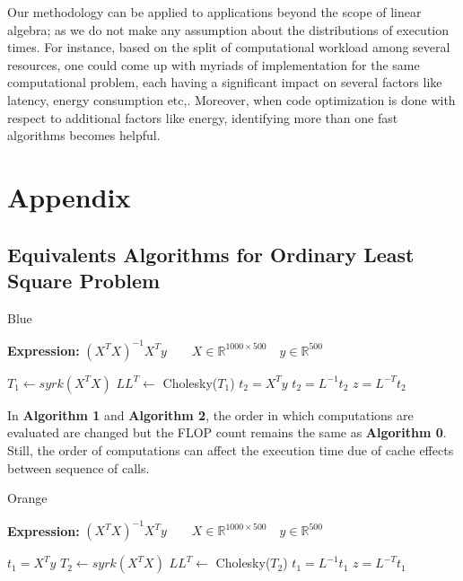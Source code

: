 \documentclass[conference]{IEEEtran}
\begin{document}
Our methodology can be applied to applications beyond the scope of linear algebra; as we do not make any assumption about the distributions of execution times.  For instance, based on the split of computational workload among several resources, one could come up with myriads of implementation for the same computational problem, each having a significant impact on several factors like latency, energy consumption etc,\cite{clonecloud}. Moreover, when code optimization is done with respect to additional factors like energy, identifying more than one fast algorithms becomes helpful. 




\clearpage
\section*{Appendix}
\subsection{Equivalents Algorithms for Ordinary Least Square Problem}
\label{sec:appA}
\begin{algorithm}
	\renewcommand{\thealgorithm}{}
	\caption{ Blue }
	\label{alg:a0}
	\textbf{Expression: } $(X^TX)^{-1}X^{T}y \qquad X \in \mathbb{R}^{1000 \times 500} \quad y \in \mathbb{R}^{500}$ 
	\begin{algorithmic}[1] 
		\State $T_1 \leftarrow syrk(X^{T}X)$ 
		\State $LL^{T} \leftarrow $ Cholesky($T_1$) 
		\State $t_2 = X^{T}y$ 
		\State $t_2 = L^{-1}t_2$ 
		\State $z = L^{-T}t_2$
	\end{algorithmic}
\end{algorithm}

In \textbf{Algorithm 1} and \textbf{Algorithm 2}, the order in which computations are evaluated are changed but the FLOP count remains the same as \textbf{Algorithm 0}. Still, the order of computations can affect the execution time due of cache effects between sequence of calls\cite{peise2014cache}.
\begin{algorithm}
	\renewcommand{\thealgorithm}{}
	\caption{ Orange }
	\label{alg:a0}
	\textbf{Expression: } $(X^TX)^{-1}X^{T}y \qquad X \in \mathbb{R}^{1000 \times 500} \quad y \in \mathbb{R}^{500}$ 
	\begin{algorithmic}[1] 
		\State $t_1 = X^{T}y$ 
		\State $T_2 \leftarrow syrk(X^{T}X)$ 
		\State $LL^{T} \leftarrow $ Cholesky($T_2$) 
		\State $t_1 = L^{-1}t_1$ 
		\State $z = L^{-T}t_1$
	\end{algorithmic}
\end{algorithm}
\end{document}
